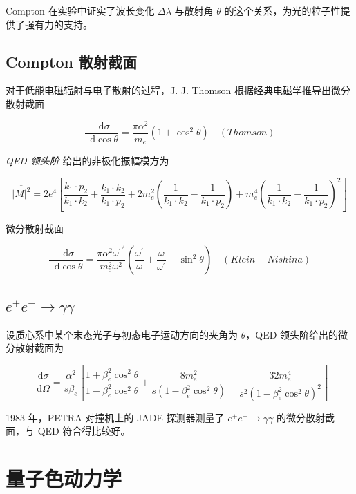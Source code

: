 \documentclass[oneside,a4paper,openany,11pt]{ctexbook}
\newcommand*{\dif}{\mathop{}\!\mathrm{d}} %
\begin{document}
Compton 在实验中证实了波长变化 $\Delta\lambda$ 与散射角 $\theta$ 的这个关系，为光的粒子性提供了强有力的支持。

\subsection{Compton 散射截面}

对于低能电磁辐射与电子散射的过程，J. J. Thomson 根据经典电磁学推导出微分散射截面

\begin{equation}
    \frac{\dif\sigma}{\dif\cos\theta} = \frac{\pi \alpha^2}{m_e} (1+\cos^2 \theta) \quad (Thomson)
\end{equation}

\emph{QED 领头阶} 给出的非极化振幅模方为

\begin{equation}
    \overline{|M|^2} = 2 e^4 \left[\frac{k_1 \cdot p_2}{k_1 \cdot k_2} + \frac{k_1 \cdot k_2}{k_1 \cdot p_2} + 2 m_e^2 \left(\frac{1}{k_1 \cdot k_2} - \frac{1}{k_1 \cdot p_2}\right) + m_e^4 \left(\frac{1}{k_1 \cdot k_2} - \frac{1}{k_1 \cdot p_2}\right)^2\right]
\end{equation}

微分散射截面

\begin{equation}
    \frac{\dif\sigma}{\dif\cos\theta} = \frac{\pi \alpha^2 {\omega^\prime}^2}{m_e^2 \omega^2} \left(\frac{\omega^\prime}{\omega} + \frac{\omega}{\omega^\prime} - \sin^2 \theta\right) \quad (Klein-Nishina)
\end{equation}

\subsection{$e^+ e^- \to \gamma\gamma$}

设质心系中某个末态光子与初态电子运动方向的夹角为 $\theta$，QED 领头阶给出的微分散射截面为

\begin{equation}
    \frac{\dif\sigma}{\dif\Omega} = \frac{\alpha^2}{s \beta_e} \left[\frac{1 + \beta_e^2 \cos^2 \theta}{1 - \beta_e^2 \cos^2 \theta} + \frac{8 m_e^2}{s(1 - \beta_e^2 \cos^2 \theta)} - \frac{32 m_e^4}{s^2(1 - \beta_e^2 \cos^2 \theta)^2}\right]
\end{equation}

1983 年，PETRA 对撞机上的 JADE 探测器测量了 $e^+ e^- \to \gamma\gamma$ 的微分散射截面，与 QED 符合得比较好。

\section{量子色动力学}
\end{document}
